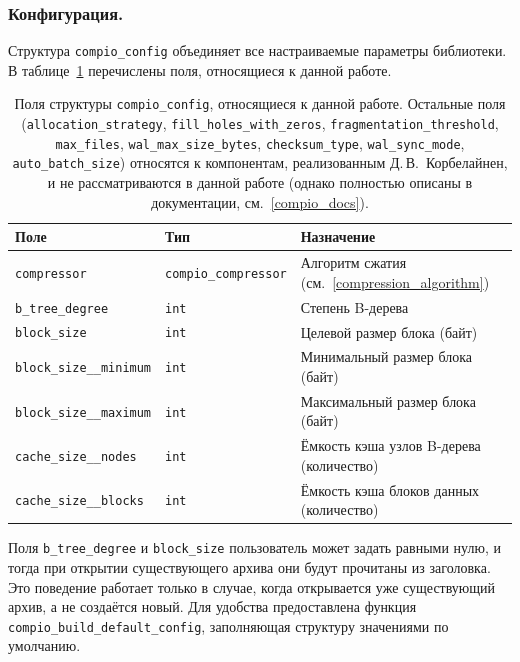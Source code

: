 \subsubsection{Конфигурация.} \label{config}
Структура \texttt{compio\_config} объединяет все настраиваемые параметры библиотеки. В таблице~\ref{tab:config-fields} перечислены поля, относящиеся к данной работе.

\begin{table}[htbp]
\centering
\small
\renewcommand{\arraystretch}{1.2}
\begin{tabular}{p{} >{\raggedleft\arraybackslash}p{} p{}}
\hline
Поле & Тип & Назначение \\
\hline
\texttt{compressor} & \texttt{compio\_compressor} & Алгоритм сжатия (см.~\ref{compression_algorithm}) \\
\texttt{b\_tree\_degree} & \texttt{int} & Степень B-дерева \\
\texttt{block\_size} & \texttt{int} & Целевой размер блока (байт) \\
\texttt{block\_size\_\_minimum} & \texttt{int} & Минимальный размер блока (байт) \\
\texttt{block\_size\_\_maximum} & \texttt{int} & Максимальный размер блока (байт) \\
\texttt{cache\_size\_\_nodes} & \texttt{int} & Ёмкость кэша узлов B-дерева (количество) \\
\texttt{cache\_size\_\_blocks} & \texttt{int} & Ёмкость кэша блоков данных (количество) \\
\hline
\end{tabular}
\caption{Поля структуры \texttt{compio\_config}, относящиеся к данной работе. Остальные поля (\texttt{allocation\_strategy}, \texttt{fill\_holes\_with\_zeros}, \texttt{fragmentation\_threshold}, \texttt{max\_files}, \texttt{wal\_max\_size\_bytes}, \texttt{checksum\_type}, \texttt{wal\_sync\_mode}, \texttt{auto\_batch\_size}) относятся к компонентам, реализованным Д.\,В.~Корбелайнен, и не рассматриваются в данной работе (однако полностью описаны в документации, см.~\ref{compio_docs}).}
\label{tab:config-fields}
\end{table}

Поля \texttt{b\_tree\_degree} и \texttt{block\_size} пользователь может задать равными нулю, и тогда при открытии существующего архива они будут прочитаны из заголовка. Это поведение работает только в случае, когда открывается уже существующий архив, а не создаётся новый. Для удобства предоставлена функция \texttt{compio\_build\_default\_config}, заполняющая структуру значениями по умолчанию.


